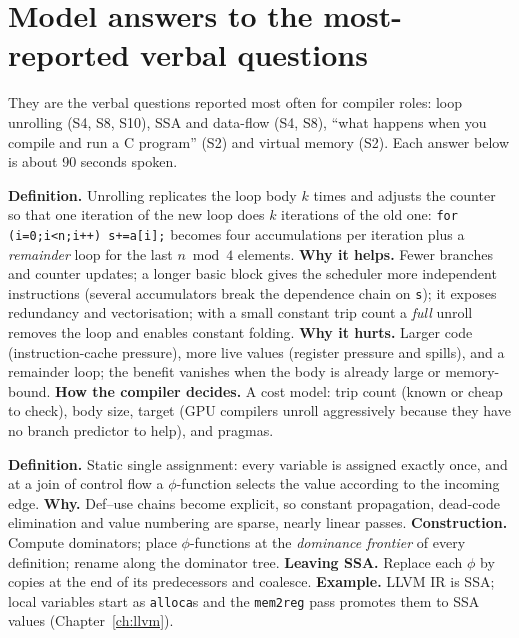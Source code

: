 \documentclass[10pt,a4paper,openany,oneside]{report}
\newcommand{\prio}[1]{\texorpdfstring{\ifcase#1\or{\color{gold}\ding{72}}\or{\color{gold}\ding{72}\ding{72}}\or{\color{gold}\ding{72}\ding{72}\ding{72}}\fi}{}}
\begin{document}
\section{Model answers to the most-reported verbal questions \prio{3}}
\begin{srcbox}
They are the verbal questions reported most often for compiler roles: loop unrolling (S4, S8, S10), SSA and data-flow (S4, S8), ``what happens when you compile and run a C program'' (S2) and virtual memory (S2). Each answer below is about 90 seconds spoken.
\end{srcbox}
\begin{exbox}
\textbf{Definition.} Unrolling replicates the loop body $k$ times and adjusts the counter so that one iteration of the new loop does $k$ iterations of the old one: \texttt{for (i=0;i<n;i++) s+=a[i];} becomes four accumulations per iteration plus a \emph{remainder} loop for the last $n \bmod 4$ elements.
\textbf{Why it helps.} Fewer branches and counter updates; a longer basic block gives the scheduler more independent instructions (several accumulators break the dependence chain on \texttt{s}); it exposes redundancy and vectorisation; with a small constant trip count a \emph{full} unroll removes the loop and enables constant folding.
\textbf{Why it hurts.} Larger code (instruction-cache pressure), more live values (register pressure and spills), and a remainder loop; the benefit vanishes when the body is already large or memory-bound.
\textbf{How the compiler decides.} A cost model: trip count (known or cheap to check), body size, target (GPU compilers unroll aggressively because they have no branch predictor to help), and pragmas.
\end{exbox}
\begin{exbox}
\textbf{Definition.} Static single assignment: every variable is assigned exactly once, and at a join of control flow a $\phi$-function selects the value according to the incoming edge. \textbf{Why.} Def--use chains become explicit, so constant propagation, dead-code elimination and value numbering are sparse, nearly linear passes. \textbf{Construction.} Compute dominators; place $\phi$-functions at the \emph{dominance frontier} of every definition; rename along the dominator tree. \textbf{Leaving SSA.} Replace each $\phi$ by copies at the end of its predecessors and coalesce. \textbf{Example.} LLVM IR is SSA; local variables start as \texttt{alloca}s and the \texttt{mem2reg} pass promotes them to SSA values (Chapter~\ref{ch:llvm}).
\end{exbox}
\end{document}
